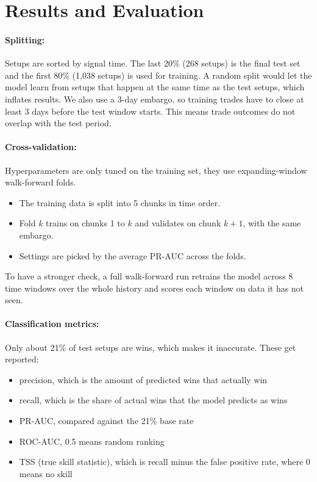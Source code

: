 \documentclass[11pt]{article}
\begin{document}
\section{Results and Evaluation}

\paragraph{Splitting:} Setups are sorted by signal time. The last 20\% (268 setups) is the final test set and the first 80\% (1,038 setups) is used for training. A random split would let the model learn from setups that happen at the same time as the test setups, which inflates results. We also use a 3-day embargo, so training trades have to close at least 3 days before the test window starts. This means trade outcomes do not overlap with the test period.

\paragraph{Cross-validation:} Hyperparameters are only tuned on the training set, they use expanding-window walk-forward folds.
\begin{itemize}
  \item The training data is split into 5 chunks in time order.
  \item Fold $k$ trains on chunks 1 to $k$ and validates on chunk $k+1$, with the same embargo.
  \item Settings are picked by the average PR-AUC across the folds.
\end{itemize}
To have a stronger check, a full walk-forward run retrains the model across 8 time windows over the whole history and scores each window on data it has not seen.

\paragraph{Classification metrics:} Only about 21\% of test setups are wins, which makes it inaccurate. These get reported:
\begin{itemize}
  \item precision, which is the amount of predicted wins that actually win
  \item recall, which is the share of actual wins that the model predicts as wins
  \item PR-AUC, compared against the 21\% base rate
  \item ROC-AUC, 0.5 means random ranking
  \item TSS (true skill statistic), which is recall minus the false positive rate, where 0 means no skill
\end{itemize}
\end{document}
